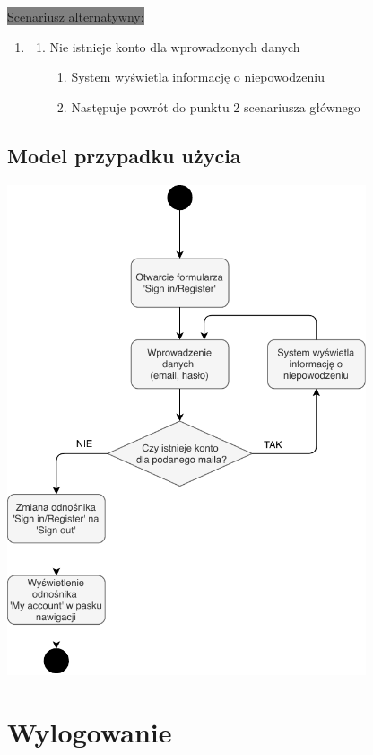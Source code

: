 \documentclass[12pt]{report}
\begin{document}
	\colorbox{grey}{Scenariusz alternatywny:}
	\begin{enumerate}\addtocounter{enumi}{3}
		\item[]
		\begin{enumerate}
			\item Nie istnieje konto dla wprowadzonych danych
			\begin{enumerate}
				\item System wyświetla informację o niepowodzeniu
				\item Następuje powrót do punktu 2 scenariusza głównego
			\end{enumerate}
		\end{enumerate}
	\end{enumerate}

	\subsection{Model przypadku użycia}
	\begin{center}
		\includegraphics[width=300pt]{logowanie.pdf}
	\end{center}
\newpage


\section{Wylogowanie}
\end{document}
